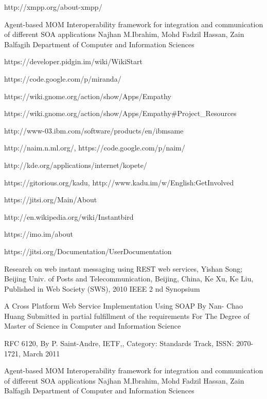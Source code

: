 \documentclass{SureshLimkar}
\begin{document}
\newline

\begin{thebibliography}{9}

http://xmpp.org/about-xmpp/

Agent-based MOM Interoperability framework for integration and
communication of different SOA applications Najhan M.Ibrahim, Mohd
Fadzil Hassan, Zain Balfagih Department of Computer and Information
Sciences

https://developer.pidgin.im/wiki/WikiStart

https://code.google.com/p/miranda/

https://wiki.gnome.org/action/show/Apps/Empathy

https://wiki.gnome.org/action/show/Apps/Empathy#Project_Resources

http://www-03.ibm.com/software/products/en/ibmsame

http://naim.n.ml.org/, https://code.google.com/p/naim/

http://kde.org/applications/internet/kopete/

https://gitorious.org/kadu, http://www.kadu.im/w/English:GetInvolved

https://jitsi.org/Main/About

http://en.wikipedia.org/wiki/Instantbird

https://imo.im/about

https://jitsi.org/Documentation/UserDocumentation

Research on web instant messaging using REST web services, Yishan
Song; Beijing Univ. of Posts and Telecommunication, Beijing, China,
Ke Xu, Ke Liu, Published in Web Society (SWS), 2010 IEEE 2 nd
Synopsium

A Cross Platform Web Service Implementation Using SOAP By Nan-
Chao Huang Submitted in partial fulfillment of the requirements For The
Degree of Master of Science in Computer and Information Science

RFC 6120, By P. Saint-Andre, IETF,, Category: Standards Track, ISSN:
2070-1721, March 2011

Agent-based MOM Interoperability framework for integration and
communication of different SOA applications Najhan M.Ibrahim, Mohd
Fadzil Hassan, Zain Balfagih Department of Computer and Information
Sciences


\end{thebibliography}
\end{document}
